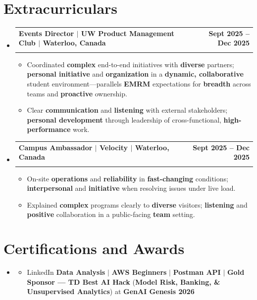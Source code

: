 \documentclass[letterpaper,10pt]{article}
\makeatletter
\newcommand{\resumeItem}[1]{
  \item\small{
    {#1 \vspace{-1pt}}
  }
}
\newcommand{\resumeSubheading}[4]{
  \vspace{-1pt}\item
    \begin{tabular*}{1.0\textwidth}[t]{l@{\extracolsep{\fill}}r}
      \textbf{#1} & \textbf{\small #2} \\
      \textit{\small#3} & \textit{\small #4} \\[-2pt]
    \end{tabular*}\vspace{-7pt}
}
\newcommand{\resumeSubHeadingListStart}{\begin{itemize}[leftmargin=0.0in, label={}]}
\newcommand{\resumeSubHeadingListEnd}{\end{itemize}}
\newcommand{\resumeItemListStart}{\begin{itemize}[leftmargin=0.15in]}
\newcommand{\resumeItemListEnd}{\end{itemize}\vspace{-4pt}}
\makeatother
\begin{document}
\section{Extracurriculars}
  \resumeSubHeadingListStart
    \resumeSubheading
      {Events Director $|$ UW Product Management Club $|$ Waterloo, Canada}{Sept 2025 -- Dec 2025}
      {}{}
      \vspace{-13pt}
      \resumeItemListStart
      \vspace{-2pt}
        \resumeItem{Coordinated \textbf{complex} end-to-end initiatives with \textbf{diverse} partners; \textbf{personal initiative} and \textbf{organization} in a \textbf{dynamic, collaborative} student environment---parallels \textbf{EMRM} expectations for \textbf{breadth} across teams and \textbf{proactive} ownership.}
        \vspace{-2pt}
        \resumeItem{Clear \textbf{communication} and \textbf{listening} with external stakeholders; \textbf{personal development} through leadership of cross-functional, \textbf{high-performance} work.}
      \resumeItemListEnd
      \vspace{-5pt}
    \resumeSubheading
      {Campus Ambassador $|$ Velocity $|$ Waterloo, Canada}{Sept 2025 -- Dec 2025}
      {}{}
      \vspace{-13pt}
      \resumeItemListStart
      \vspace{-2pt}
        \resumeItem{On-site \textbf{operations} and \textbf{reliability} in \textbf{fast-changing} conditions; \textbf{interpersonal} and \textbf{initiative} when resolving issues under live load.}
        \vspace{-2pt}
        \resumeItem{Explained \textbf{complex} programs clearly to \textbf{diverse} visitors; \textbf{listening} and \textbf{positive} collaboration in a public-facing \textbf{team} setting.}
      \resumeItemListEnd
      \vspace{-2pt}
  \resumeSubHeadingListEnd
\vspace{-13pt}

\section{Certifications and Awards}
    \resumeSubHeadingListStart
      \item[]
          \resumeItemListStart
            \resumeItem{LinkedIn \textbf{Data Analysis} $|$ \textbf{AWS Beginners} $|$ \textbf{Postman API} $|$ \textbf{Gold Sponsor --- TD Best AI Hack} (\textbf{Model Risk, Banking, \& Unsupervised Analytics}) at \textbf{GenAI Genesis 2026}}
          \resumeItemListEnd
          \vspace{-8pt}
   \resumeSubHeadingListEnd
\end{document}
